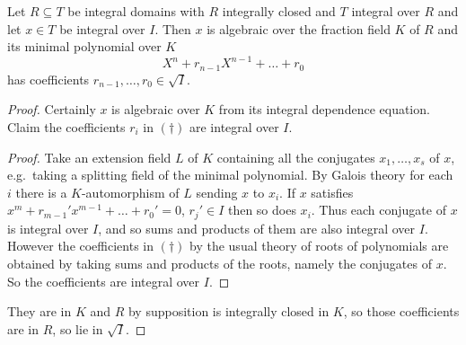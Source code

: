 \documentclass[a4paper]{article}
\begin{document}
\begin{lemma}
  \label{lem:coefficient of min poly of an element integral over an ideal}
  Let \(R \subseteq T\) be integral domains with \(R\) integrally closed and \(T\) integral over \(R\) and let \(x \in T\) be integral over \(I\). Then \(x\) is algebraic over the fraction field \(K\) of \(R\) and its minimal polynomial over \(K\)
  \[
    X^n + r_{n - 1} X^{n - 1} + \dots + r_0
    \tag{\dagger}
  \]
  has coefficients \(r_{n - 1}, \dots, r_0 \in \sqrt I\).
\end{lemma}

\begin{proof}
  Certainly \(x\) is algebraic over \(K\) from its integral dependence equation. Claim the coefficients \(r_i\) in \((\dagger)\) are integral over \(I\).
  \begin{proof}
    Take an extension field \(L\) of \(K\) containing all the conjugates \(x_1, \dots, x_s\) of \(x\), e.g.\ taking a splitting field of the minimal polynomial. By Galois theory for each \(i\) there is a \(K\)-automorphism of \(L\) sending \(x\) to \(x_i\). If \(x\) satisfies \(x^m + r_{m - 1}' x^{m - 1} + \dots + r_0' = 0\), \(r_j' \in I\) then so does \(x_i\). Thus each conjugate of \(x\) is integral over \(I\), and so sums and products of them are also integral over \(I\). However the coefficients in \((\dagger)\) by the usual theory of roots of polynomials are obtained by taking sums and products of the roots, namely the conjugates of \(x\). So the coefficients are integral over \(I\).
  \end{proof}
  They are in \(K\) and \(R\) by supposition is integrally closed in \(K\), so those coefficients are in \(R\), so lie in \(\sqrt I\).
\end{proof}
\end{document}

